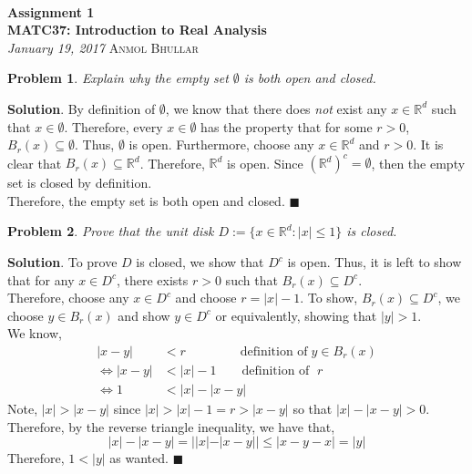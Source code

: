 \documentclass[12pt]{article}
\renewcommand{\=}[1]{\stackrel{#1}{=}} %
\newtheorem{p}{Problem}[section]
\theoremstyle{definition}
\newenvironment{s}{%
        \begin{trivlist} \item \textbf{Solution}. }{%
            \hspace*{\fill} $\blacksquare$\end{trivlist}}%
\begin{document}
{\noindent\Huge\bf  \\[0.5\baselineskip] {\selectfont  %
Assignment 1}         }\\[2\baselineskip] %
{ {\bf {}\selectfont MATC37: Introduction to Real Analysis}\\ {\textit{%
\selectfont January 19, 2017}}}
{\large \textsc{Anmol Bhullar}} %
\\[1.4\baselineskip]

\begin{p}
    Explain why the empty set $\emptyset$ is both open and closed.
\end{p}
\begin{s}
    By definition of $\emptyset$, we know that there does \textit{not} exist any $x\in\mathbb{R}^d$ such that $x\in\emptyset$. 
    Therefore, every $x\in\emptyset$ has the property that for some $r>0$, $B_r(x)\subseteq\emptyset$. Thus, $\emptyset$ is open.
    Furthermore, choose any $x\in\mathbb{R}^d$ and $r>0$. It is clear that $B_r(x)\subseteq\mathbb{R}^d$. 
    Therefore, $\mathbb{R}^d$ is open. Since $(\mathbb{R}^d)^c = \emptyset$, then the empty set is closed by definition.\\
    Therefore, the empty set is both open and closed.
\end{s}

\begin{p}
    Prove that the unit disk $D := \{x\in\mathbb{R}^d: |x|\leq 1\}$ is closed.
\end{p}
\begin{s}
    To prove $D$ is closed, we show that $D^c$ is open. Thus, it is left to show that for any $x\in D^c$, there exists $r>0$ such that
    $B_r(x) \subseteq D^c$.\\
    Therefore, choose any $x\in D^c$ and choose $r = |x| - 1$. To show, $B_r(x)\subseteq D^c$, we choose $y\in B_r(x)$ and show
    $y\in D^c$ or equivalently, showing that $|y|>1$.\\
    We know,
    \begin{align*}
        |x-y| &< r \qquad\qquad\;\text{definition of}\;y\in B_r(x)\\
        \iff |x-y| &< |x| - 1 \qquad\text{definition of }\; r\\
        \iff 1 &< |x| - |x-y|
    \end{align*}
    Note, $|x| > |x-y|$ since $|x|>|x|-1 = r > |x-y|$ so that $|x|-|x-y|>0$. Therefore, by the reverse triangle inequality,
    we have that,
    \[ |x| - |x-y| = | |x| - |x-y| | \leq |x - y - x| = |y| \]
    Therefore, $1 < |y|$ as wanted.
\end{s}
\end{document}
